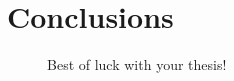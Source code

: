\chapter{Conclusions}
\label{chap:conclusions}

\begin{figure}[hp]
\centering
{}
\caption{
    Best of luck with your thesis!
}
\label{fig:offensive}
\end{figure}

